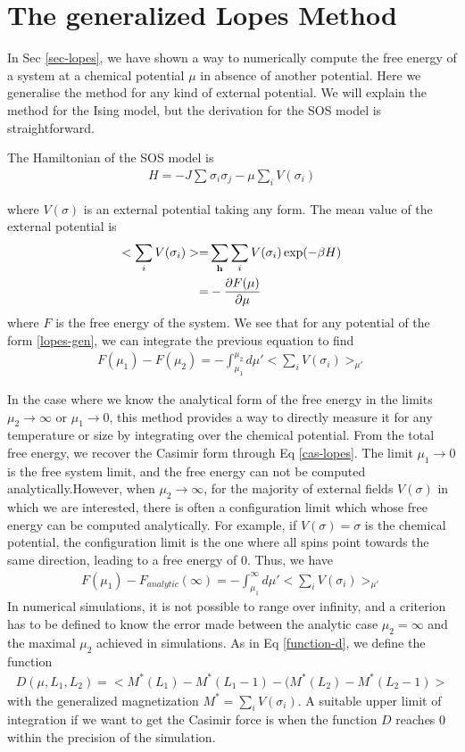 \section{The generalized Lopes Method}
{\color{blue}
In Sec \ref{sec-lopes}, we have shown a way to numerically compute the free energy of a system at a chemical potential $\mu$ in absence of another potential. Here we generalise the method for any kind of external potential. We will explain the method for the Ising model, but the derivation for the SOS model is straightforward.

The Hamiltonian of the SOS model is
\begin{align}
H = - J \sum_{} \sigma_i \sigma_j - \mu \sum_i V(\sigma_i)
\end{align}

where $V(\sigma)$ is an external potential taking any form. The mean value of the external potential is
\begin{align}
    <  \sum_i V(\sigma_i) > =&  \sum_{\bf h} \sum_i V(\sigma_i) \exp(-\beta H) \nonumber \\
    =&  - \frac{\partial F(\mu)}{\partial \mu}
\end{align}
where $F$ is the free energy of the system. We see that for any potential of the form \eqref{lopes-gen}, we can integrate the previous equation to find
\begin{align}
   F(\mu_1) - F(\mu_2) = - \int_{\mu_1}^{\mu_2} d\mu'  < \sum_i V(\sigma_i) >_{\mu'} 
   \label{lopes-gen}
\end{align}

In the case where we know the analytical form of the free energy in the limits $\mu_2 \to \infty$ or $\mu_1 \to 0$, this method provides a way to directly measure it for any temperature or size by integrating over the chemical potential.
From the total free energy, we recover the Casimir form through Eq \eqref{cas-lopes}.
The limit $\mu_1 \to 0$ is the free system limit, and the free energy can not be computed analytically.However, when $\mu_2 \to \infty$, for  the majority of external fields $V(\sigma)$ in which we are interested, there is often a configuration limit which whose free energy can be computed analytically. For example, if $V(\sigma)=\sigma$ is the chemical potential, the configuration limit is the one where all spins point towards the same direction, leading to a free energy of $0$. Thus, we have
\begin{align}
   F(\mu_1) - F_{analytic}(\infty) = - \int_{\mu_1}^{\infty} d\mu'  < \sum_i V(\sigma_i) >_{\mu'} 
   \label{lopes-gen}
\end{align}
In numerical simulations, it is not possible to range over infinity, and a criterion has to be defined to know the error made between the analytic case $\mu_2 = \infty$ and the maximal $\mu_2$ achieved in simulations. As in Eq \eqref{function-d}, we define the function
\begin{align}
    D(\mu,L_1,L_2) =  < M^\ast(L_1)-M^\ast(L_1-1) - (M^\ast(L_2)-M^\ast(L_2-1) >
\end{align}
with the generalized magnetization $M^\ast = \sum_i V(\sigma_i)$. A suitable upper limit of integration if we want to get the Casimir force is when the function $D$ reaches $0$ within the precision of the simulation.


}
